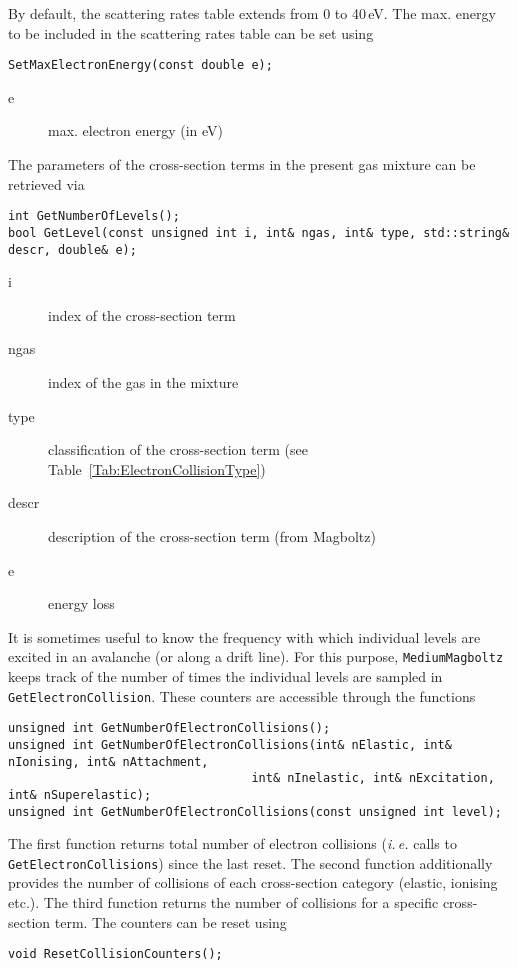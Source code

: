 By default, the scattering rates table extends from 0 to 40\,eV. 
The max. energy to be included in the scattering rates table 
can be set using
\begin{lstlisting}
SetMaxElectronEnergy(const double e);
\end{lstlisting}
\begin{description}
\item[e]
  max. electron energy (in eV)
\end{description}

The parameters of the cross-section terms in the present gas mixture 
can be retrieved via
\begin{lstlisting}
int GetNumberOfLevels();
bool GetLevel(const unsigned int i, int& ngas, int& type, std::string& descr, double& e);
\end{lstlisting}
\begin{description}
  \item[i] index of the cross-section term
  \item[ngas] index of the gas in the mixture
  \item[type] classification of the cross-section term 
              (see Table~\ref{Tab:ElectronCollisionType})
  \item[descr] description of the cross-section term (from Magboltz)
  \item[e] energy loss
\end{description}

It is sometimes useful to know the frequency with which individual levels 
are excited in an avalanche (or along a drift line). 
For this purpose, \texttt{MediumMagboltz} keeps track of the number of times 
the individual levels are sampled in \texttt{GetElectronCollision}. 
These counters are accessible through the functions
\begin{lstlisting}
unsigned int GetNumberOfElectronCollisions();
unsigned int GetNumberOfElectronCollisions(int& nElastic, int& nIonising, int& nAttachment,
                                  int& nInelastic, int& nExcitation, int& nSuperelastic);
unsigned int GetNumberOfElectronCollisions(const unsigned int level);
\end{lstlisting}
The first function returns total number of electron collisions (\textit{i.\,e.} calls 
to \texttt{GetElectronCollisions}) since the last reset. 
The second function additionally provides the number of collisions of each 
cross-section category (elastic, ionising etc.). 
The third function returns the number of collisions for a specific cross-section term.
The counters can be reset using
\begin{lstlisting}
void ResetCollisionCounters();
\end{lstlisting} 

